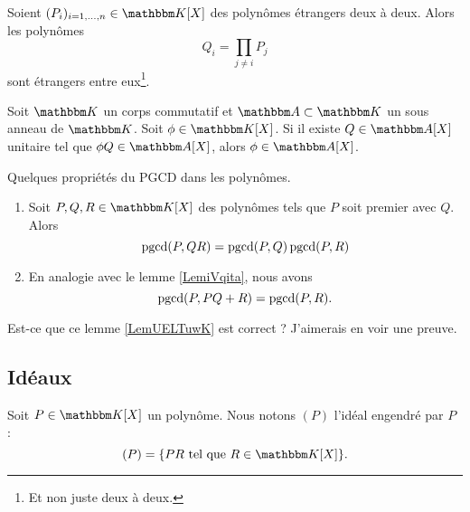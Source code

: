 \begin{lemma}       \label{LemuALZHn}
    Soient \( (P_i)_{i=1,\ldots,n}\in \eK[X]\) des polynômes étrangers deux à deux. Alors les polynômes \begin{equation} Q_i=\prod_{j\neq i}P_j \end{equation}
    sont étrangers entre eux\footnote{Et non juste deux à deux.}.
\end{lemma}

\begin{lemma}   \label{LemzwkYdn}
    Soit \( \eK\) un corps commutatif et \( \eA\subset \eK\) un sous anneau de \( \eK\). Soit \( \phi\in \eK[X]\). Si il existe \( Q\in \eA[X]\) unitaire tel que \( \phi Q\in \eA[X]\), alors \( \phi\in \eA[X]\).
\end{lemma}

\begin{lemma}   \label{LemUELTuwK}
    Quelques propriétés du PGCD dans les polynômes.
    \begin{enumerate}
        \item
            Soit \( P,Q,R\in \eK[X]\) des polynômes tels que \( P\) soit premier avec \( Q\). Alors
            \begin{equation}
                \operatorname{pgcd}(P,QR)=\operatorname{pgcd}(P,Q)\operatorname{pgcd}(P,R)
            \end{equation}
        \item
            En analogie avec le lemme \ref{LemiVqita}, nous avons
            \begin{equation}
                \operatorname{pgcd}(P,PQ+R)=\operatorname{pgcd}(P,R).
            \end{equation}
    \end{enumerate}
\end{lemma}
\begin{probleme}
    Est-ce que ce lemme \ref{LemUELTuwK} est correct ? J'aimerais en voir une preuve.
\end{probleme}

\subsection{Idéaux}

Soit \( P\in \eK[X]\) un polynôme. Nous notons \( (P)\) l'idéal engendré par \( P\) :
\begin{equation}        \label{EqDefxMkDtW}
    (P)=\{ PR\tq R\in\eK[X] \}.
\end{equation}

